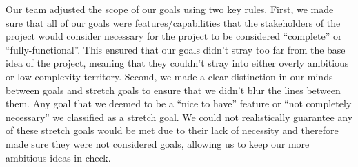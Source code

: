 \documentclass{article}
\begin{document}
Our team adjusted the scope of our goals using two key rules. First, we made
sure that all of our goals were features/capabilities that the stakeholders
of the project would consider necessary for the project to be considered
“complete” or “fully-functional”. This ensured that our goals didn’t stray too
far from the base idea of the project, meaning that they couldn’t stray into
either overly ambitious or low complexity territory. Second, we made a clear
distinction in our minds between goals and stretch goals to ensure that we
didn’t blur the lines between them. Any goal that we deemed to be a
“nice to have” feature or “not completely necessary” we classified as a stretch
goal. We could not realistically guarantee any of these stretch goals would be
met due to their lack of necessity and therefore made sure they were not
considered goals, allowing us to keep our more ambitious ideas in check.
\end{document}
